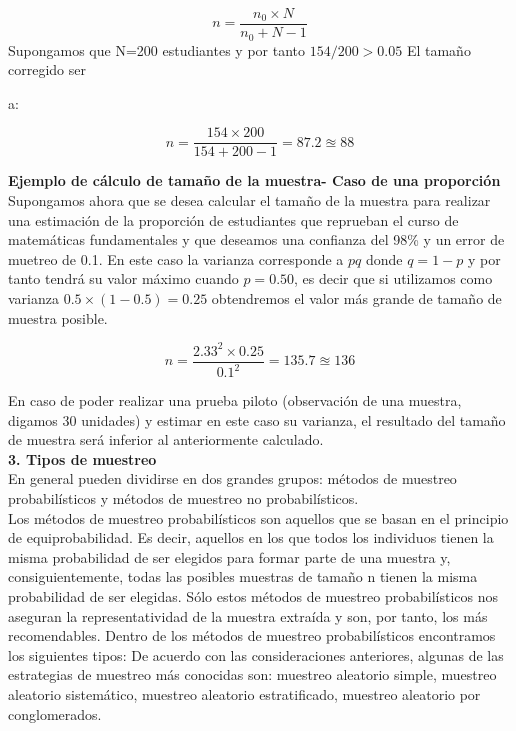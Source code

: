 \documentclass[base=hide,11pt]{elegantbook}
\begin{document}
$$n=\dfrac{n_{0} \times N}{n_{0}+N-1}$$
Supongamos que N=200 estudiantes y por tanto $154/200 > 0.05$ El tamaño corregido ser{a:
			
$$n= \dfrac{154 \times 200}{154 + 200 -1} =87.2 \approxeq 88 $$

\vspace{.5cm}			
\textcolor{col3}{\bf \large Ejemplo de cálculo de tamaño de la muestra- Caso de una proporción}\\ 
Supongamos ahora que se desea calcular el tamaño de la muestra para realizar una estimación de la proporción de estudiantes que reprueban el curso de matemáticas fundamentales y que deseamos una confianza del 98\% y un error de muetreo de 0.1. En este caso la varianza corresponde a $pq$ donde $q=1-p$ y por tanto tendrá su valor máximo cuando $p=0.50$, es decir que si utilizamos como varianza $0.5 \times (1-0.5)=0.25$ obtendremos el valor más grande de tamaño de muestra posible.
			
			$$ n=\dfrac{2.33^2 \times 0.25}{0.1^{2}}=135.7 \approxeq 136$$
			
En caso de poder realizar una prueba piloto (observación de una muestra, digamos 30 unidades) y estimar en este caso su varianza, el resultado del tamaño de muestra será inferior al anteriormente calculado.\\
			
\textcolor{col4}{\bf \LARGE 3. Tipos de muestreo}\\

En general pueden dividirse en dos grandes grupos: métodos de muestreo probabilísticos y métodos de muestreo no probabilísticos.\\
		
Los métodos de muestreo probabilísticos son aquellos que se basan en el principio de equiprobabilidad. Es decir, aquellos en los que todos los individuos tienen la misma
probabilidad de ser elegidos para formar parte de una muestra y, consiguientemente, todas las posibles muestras de tamaño n tienen la misma probabilidad de ser elegidas.
Sólo estos métodos de muestreo probabilísticos nos aseguran la representatividad de la muestra extraída y son, por tanto, los más recomendables. Dentro de los métodos de
muestreo probabilísticos encontramos los siguientes tipos:
De acuerdo con las consideraciones anteriores, algunas de las estrategias de muestreo más conocidas son:
muestreo aleatorio simple, muestreo aleatorio sistemático, muestreo aleatorio estratificado, muestreo aleatorio por conglomerados.\\
			

}
\end{document}
